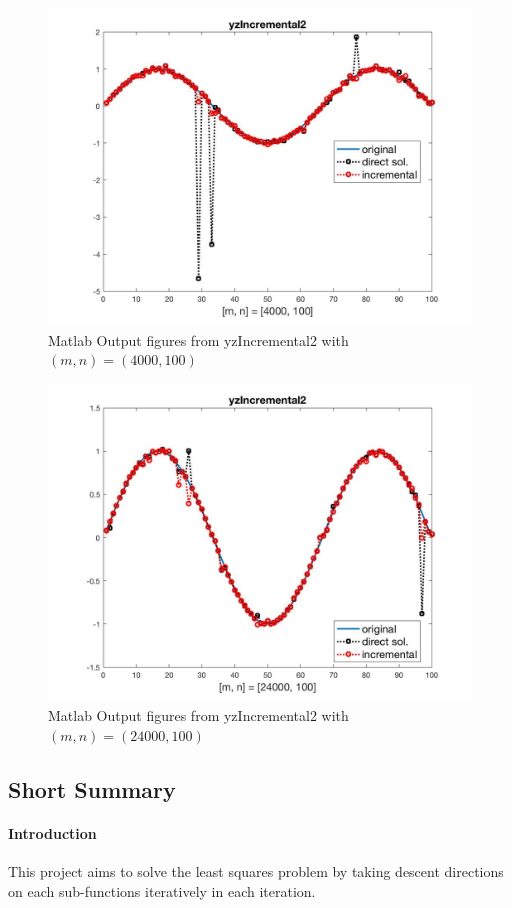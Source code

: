 \begin{figure}[H]
\centering
\includegraphics[width=12cm]{f_9}
\caption{Matlab Output figures from yzIncremental2 with$(m,n)=(4000,100)$}
\end{figure}
\begin{figure}[H]
\centering
\includegraphics[width=12cm]{f_10}
\caption{Matlab Output figures from yzIncremental2 with$(m,n)=(24000,100)$}
\end{figure}
\clearpage
\subsection*{Short Summary}
\paragraph{Introduction}
This project aims to solve the least squares problem by taking descent directions on each sub-functions iteratively in each iteration.

